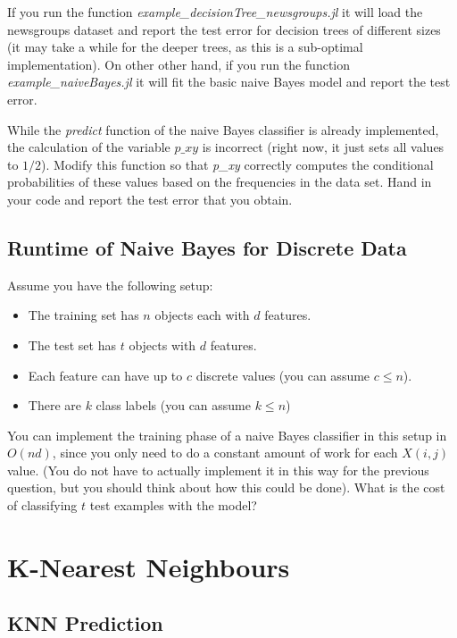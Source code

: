 \documentclass{article}
\def\blu#1{{\color{blu}#1}}
\def\items#1{\begin{itemize}#1\end{itemize}}
\begin{document}
If you run the function \emph{example\_decisionTree\_newsgroups.jl} it will load the newsgroups dataset and report the test error for decision trees of different sizes (it may take a while for the deeper trees, as this is a sub-optimal implementation). On other other hand, if you run the function \emph{example\_naiveBayes.jl} it will fit the basic naive Bayes model and report the test error.

While the \emph{predict} function of the naive Bayes classifier is already implemented, the calculation of the variable $p\_xy$ is incorrect (right now, it just sets all values to $1/2$). \blu{Modify this function so that \emph{p\_xy} correctly computes the conditional probabilities of these values based on the frequencies in the data set. Hand in your code and report the test error that you obtain.}


\subsection{Runtime of Naive Bayes for Discrete Data}

Assume you have the following setup:
\items{
\item The training set has $n$ objects each with $d$ features.
\item The test set has $t$ objects with $d$ features.
\item Each feature can have up to $c$ discrete values (you can assume $c \leq n$).
\item There are $k$ class labels (you can assume $k \leq n$)
}
You can implement the training phase of a naive Bayes classifier in this setup in $O(nd)$, since you only need to do a constant amount of work for each $X(i,j)$ value. (You do not have to actually implement it in this way for the previous question, but you should think about how this could be done). \blu{What is the cost of classifying $t$ test examples with the model?}




\section{K-Nearest Neighbours}

\subsection{KNN Prediction}
\end{document}
